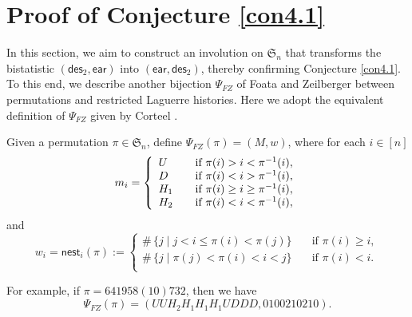 \documentclass[12pt]{article}
\numberwithin{equation}{section}
\theoremstyle{plain}
\def\des{\mathsf{des}}
\def\ear{\mathsf{ear}}
\def\nest{\mathsf{nest}}
\begin{document}
     \section{Proof of Conjecture \ref{con4.1}} 
    In this section, we aim to construct an involution on $\mathfrak{S}_n$ that transforms the bistatistic $(\des_2, \ear)$ into $(\ear, \des_2)$, thereby confirming Conjecture \ref{con4.1}.
    To this end, we describe another bijection $\Psi_{FZ}$ of Foata and Zeilberger \cite{FZ} between permutations and restricted Laguerre histories.
    Here we adopt the equivalent definition of $\Psi_{FZ}$ given by Corteel \cite{Corteel2007}.
    
     
     
     
     
     
      Given a permutation $\pi\in \mathfrak{S}_n$, 
       define $\Psi_{FZ}(\pi)=(M,w)$, where for each   $i\in[n]$
     $$
     m_i=\left\{
     \begin{array}{ll}
     	U&\quad\mbox{if $ \pi(i)>i<\pi^{-1}(i)$},  \\
     	D&\quad\mbox{if $ \pi(i)<i>\pi^{-1}(i)$},  \\
     	H_1&\quad\mbox{if $ \pi(i)\geq i\geq \pi^{-1}(i)$},\\
     	H_2&\quad\mbox{if $ \pi(i)<i<\pi^{-1}(i)$},
     \end{array}
     \right.
     $$
     and $$
     w_i=\nest_i(\pi):=	\begin{cases}
     	\#\,\{j\mid j<i\leq \pi(i)<\pi(j)\}&\quad \text{if $\pi(i)\geq i$},\\
     		\#\,\{j\mid \pi(j)<\pi(i)<i<j \}&\quad \text{if $\pi(i)<i$}.\\ 
     \end{cases}
     $$
     
     
     
     For example, if $\pi=641958(10)732$, then we have
     $$\Psi_{FZ}(\pi)=(UUH_2H_1H_1H_1UDDD, 0100210210).$$
     
\end{document}
